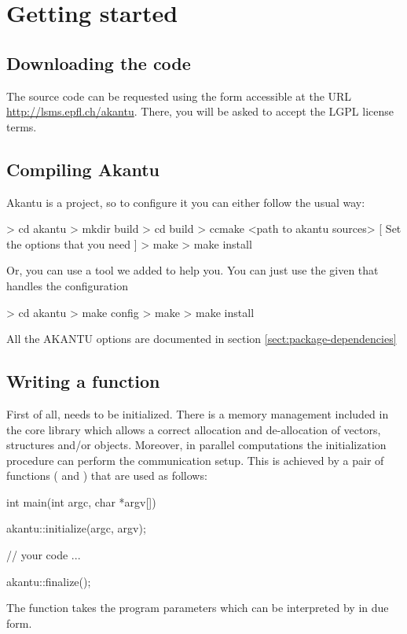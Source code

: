\chapter{Getting started}
\section{Downloading the code}

The \akantu source code can be requested using the form accessible at the URL
\url{http://lsms.epfl.ch/akantu}.  There, you will be asked to accept the LGPL
license terms.

\section{Compiling Akantu}

Akantu is a  project, so to configure it you can either follow the usual way:
\begin{command}
  > cd akantu
  > mkdir build
  > cd build
  > ccmake <path to akantu sources>
  [ Set the options that you need ]
  > make
  > make install
\end{command}

Or, you can use a tool  we added to help you. You can just use the
given  that handles the  configuration

\begin{command}
  > cd akantu
  > make config
  > make
  > make install
\end{command}

All the AKANTU options are documented in section \ref{sect:package-dependencies}


\section{Writing a  function\label{sect:common:main}}

First of all, \akantu needs to be initialized.  There is a memory
management included in the core library which allows a correct
allocation and de-allocation of vectors, structures and/or
objects. Moreover, in parallel computations the initialization
procedure can perform the communication setup. This is achieved by
 a pair of functions ( and )
that are used as follows:
\begin{cpp}
int main(int argc, char *argv[])
{
  akantu::initialize(argc, argv);

  // your code
  ...

  akantu::finalize();
}
\end{cpp}
The  function takes the program parameters which
can be interpreted by \akantu in due form.


